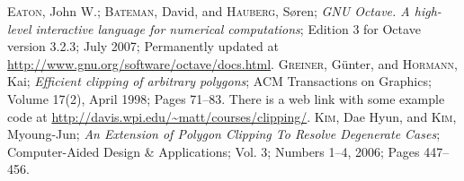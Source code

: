 \documentclass[10pt,a4paper]{article}
\begin{document}
%
%
%
%
%
%
%
%
%

\begin{thebibliography}{99}
 \textsc{Eaton}, John W.; \textsc{Bateman}, David, and
                 \textsc{Hauberg}, S\o{}ren; \textit{GNU Octave. A high-level
                 interactive language for numerical computations}; Edition 3 for
                 Octave version 3.2.3; July 2007; Permanently updated at
                 \url{http://www.gnu.org/software/octave/docs.html}.
 \textsc{Greiner}, G\"unter, and \textsc{Hormann}, Kai;
                      \textit{Efficient clipping of arbitrary polygons};
                      ACM Transactions on Graphics; Volume 17(2), April 1998;
                      Pages 71--83.
                      There is a web link with some example code at
                      \url{http://davis.wpi.edu/~matt/courses/clipping/}.
 \textsc{Kim}, Dae Hyun, and \textsc{Kim}, Myoung-Jun;
                   \textit{An Extension of Polygon Clipping To Resolve
                           Degenerate Cases};
                   Computer-Aided Design \& Applications; Vol. 3; Numbers 1--4,
                   2006; Pages 447--456.
\end{thebibliography}
\end{document}
